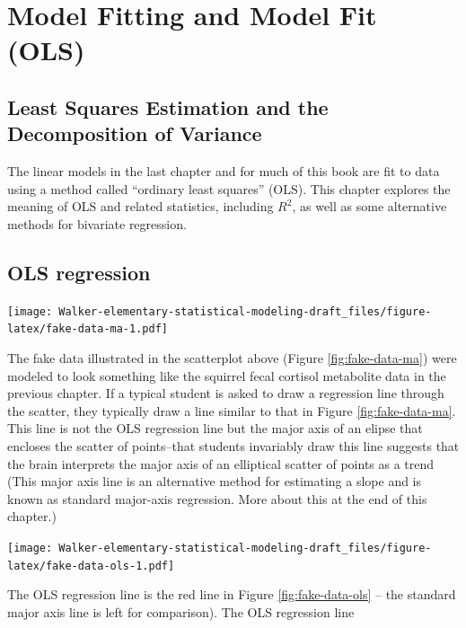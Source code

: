 \documentclass[]{book}
\begin{document}
\hypertarget{model-fitting-and-model-fit-ols}{%
\chapter{Model Fitting and Model Fit (OLS)}\label{model-fitting-and-model-fit-ols}}

\hypertarget{least-squares-estimation-and-the-decomposition-of-variance}{%
\section{Least Squares Estimation and the Decomposition of Variance}\label{least-squares-estimation-and-the-decomposition-of-variance}}

The linear models in the last chapter and for much of this book are fit to data using a method called ``ordinary least squares'' (OLS). This chapter explores the meaning of OLS and related statistics, including \(R^2\), as well as some alternative methods for bivariate regression.

\hypertarget{ols-regression}{%
\section{OLS regression}\label{ols-regression}}

\texttt{[image: Walker-elementary-statistical-modeling-draft\_files/figure-latex/fake-data-ma-1.pdf]}

The fake data illustrated in the scatterplot above (Figure \ref{fig:fake-data-ma}) were modeled to look something like the squirrel fecal cortisol metabolite data in the previous chapter. If a typical student is asked to draw a regression line through the scatter, they typically draw a line similar to that in Figure \ref{fig:fake-data-ma}. This line is not the OLS regression line but the major axis of an elipse that encloses the scatter of points--that students invariably draw this line suggests that the brain interprets the major axis of an elliptical scatter of points as a trend (This major axis line is an alternative method for estimating a slope and is known as standard major-axis regression. More about this at the end of this chapter.)

\texttt{[image: Walker-elementary-statistical-modeling-draft\_files/figure-latex/fake-data-ols-1.pdf]}

The OLS regression line is the red line in Figure \ref{fig:fake-data-ols} -- the standard major axis line is left for comparison). The OLS regression line
\end{document}

